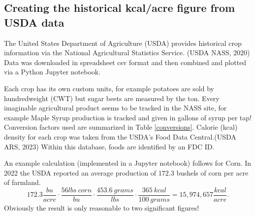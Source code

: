 \documentclass[man]{apa7}
\newcommand{\be}{\begin{equation}}
\newcommand{\ee}{\end{equation}}
\begin{document}
\subsection{Creating the historical kcal/acre figure from USDA data}
\label{how_yield_plot_is_made}
The United States Department of Agriculture (USDA) provides historical crop information via the National Agricultural Statistics Service. (USDA NASS, 2020)
Data was downloaded in spreadsheet csv format and then combined and plotted via a Python Jupyter notebook.   

Each crop has its own custom units, for example potatoes are sold by hundredweight (CWT) but sugar beets are measured by the ton.  
Every imaginable agricultural product seems to be tracked in the NASS site, for example Maple Syrup production is tracked and given in gallons of syrup per tap! 
Conversion factors used are summarized in Table \ref{conversions}.  
Calorie (kcal) density for each crop was taken from the USDA's Food Data Central.(USDA ARS, 2023)
Within this database, foods are identified by an FDC ID.  

An example calculation (implemented in a Jupyter notebook) follows for Corn.  
In 2022 the USDA reported an average production of $172.3$ bushels of corn per acre of farmland.  
\be
172.3\frac{bu}{acre}\cdot\frac{56lbs~corn}{bu}\cdot\frac{453.6~grams}{lbs}\cdot\frac{365~kcal}{100~grams} = 15,974,657 \frac{kcal}{acre} .
\label{example_calculation}
\ee
Obviously the result is only reasonable to two significant figures!
\end{document}
